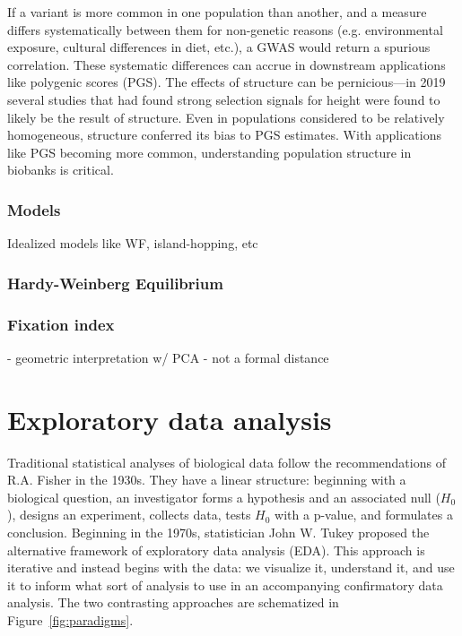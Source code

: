 If a variant is more common in one population than another, and a measure differs systematically between them for non-genetic reasons (e.g. environmental exposure, cultural differences in diet, etc.), a GWAS would return a spurious correlation\citep{price_principal_2006}. These systematic differences can accrue in downstream applications like polygenic scores (PGS)\citep{zaidi_demographic_2020}. The effects of structure can be pernicious---in 2019 several studies that had found strong selection signals for height were found to likely be the result of structure\citep{berg_reduced_2019}. Even in populations considered to be relatively homogeneous, structure conferred its bias to PGS estimates\citep{kerminen_geographic_2019}. With applications like PGS becoming more common, understanding population structure in biobanks is critical\citep{kaplan_polygenic_2022}.

\subsubsection{Models}

Idealized models like WF, island-hopping, etc

\subsubsection{Hardy-Weinberg Equilibrium}



\subsubsection{Fixation index}

- geometric interpretation w/ PCA\citep{peter_geometric_2022}
- not a formal distance\citep{arbisser_fst_2020}

\section{Exploratory data analysis}

Traditional statistical analyses of biological data follow the recommendations of R.A. Fisher in the 1930s\citep{holmes_modern_2019}. They have a linear structure: beginning with a biological question, an investigator forms a hypothesis and an associated null ($H_0$), designs an experiment, collects data, tests $H_0$ with a p-value, and formulates a conclusion. Beginning in the 1970s, statistician John W. Tukey proposed the alternative framework of exploratory data analysis (EDA)\citep{tukey_1977,hoaglin_john_2003}. This approach is iterative and instead begins with the data: we visualize it, understand it, and use it to inform what sort of analysis to use in an accompanying confirmatory data analysis. The two contrasting approaches are schematized in Figure~\ref{fig:paradigms}.

